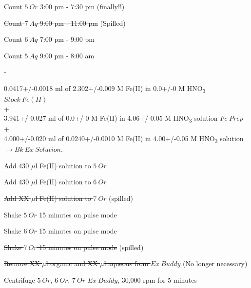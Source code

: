\documentclass[idxtotoc,hyperref,openany,oneside]{labbook} %
\newcommand{\cmark}{\ding{51}}%
\newcommand{\done}{\rlap{$\square$}{\raisebox{2pt}{\large\hspace{1pt}\cmark}}%
  \hspace{-2.5pt}}
\newcommand{\tsbs}{\textsubscript}
\begin{document}
\begin{todolist}
\item[\done]{Count $\boxed{5\ Or}$ 3:00 pm - 7:30 pm (finally!!)}
\item{\st{Count $\boxed{7\ Aq}$ 9:00 pm - 11:00 pm} (Spilled)}
\item[\done]{Count $\boxed{6\ Aq}$ 7:00 pm - 9:00 pm}
\item[\done]{Count $\boxed{5\ Aq}$ 9:00 pm - 8:00 am}
\end{todolist}
\begin{todolist}
\item[\done]{-}
\end{todolist}
\begin{center}
0.0417+/-0.0018 ml of 2.302+/-0.009 M Fe(II) in 0.0+/-0 M HNO\tsbs{3} $\boxed{Stock\ Fe(II)}$\\
+\\
3.941+/-0.027 ml of 0.0+/-0 M Fe(II) in 4.06+/-0.05 M HNO\tsbs{3} solution $\boxed{Fe\ Prep}$\\
+\\
4.000+/-0.020 ml of 0.0240+/-0.0010 M Fe(II) in 4.00+/-0.05 M HNO\tsbs{3} solution $\boxed{\rightarrow Bk\ Ex\ Solution}$.
\end{center}
\begin{todolist}
\item[\done]{Add 430 $\mu$l Fe(II) solution to $\boxed{5\ Or}$}
\item[\done]{Add 430 $\mu$l Fe(II) solution to $\boxed{6\ Or}$}
\item{\st{Add XX $\mu$l Fe(II) solution to $\boxed{7\ Or}$} (spilled)}
\item[\done]{Shake $\boxed{5\ Or}$ 15 minutes on pulse mode}
\item[\done]{Shake $\boxed{6\ Or}$ 15 minutes on pulse mode}
\item{\st{Shake $\boxed{7\ Or}$ 15 minutes on pulse mode} (spilled)}
\item{\st{Remove XX $\mu$l organic and XX $\mu$l aqueous
  from $\boxed{Ex\ Buddy}$} (No longer necessary)}
\item[\done]{Centrifuge $\boxed{5\ Or}$, $\boxed{6\ Or}$, \st{$\boxed{7\ Or}$}
  \st{$\boxed{Ex\ Buddy}$}, 30,000 rpm for 5 minutes}
\end{todolist}
\end{document}
